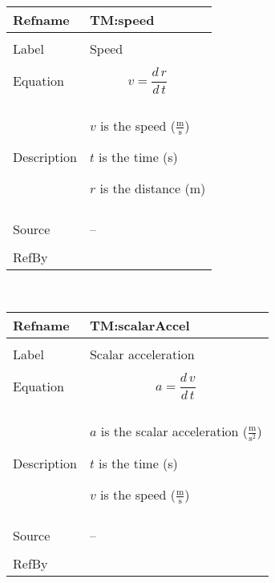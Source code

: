\documentclass[12pt]{article}
\begin{document}
\noindent \begin{minipage}{\textwidth}
\begin{tabular}{p{} p{}}
\toprule \textbf{Refname} & \textbf{TM:speed}
\label{TM:speed}
\\ \midrule \\
Label & Speed
\\ \midrule \\
Equation & \begin{displaymath}
           v=\frac{d\,r}{d\,t}
           \end{displaymath}
\\ \midrule \\
Description & \begin{symbDescription}
              \item{$v$ is the speed ($\frac{\text{m}}{\text{s}}$)}
              \item{$t$ is the time (s)}
              \item{$r$ is the distance (m)}
              \end{symbDescription}
\\ \midrule \\
Source & --
\\ \midrule \\
RefBy & 
\\ \bottomrule \end{tabular}
\end{minipage}
\par~

\noindent \begin{minipage}{\textwidth}
\begin{tabular}{p{} p{}}
\toprule \textbf{Refname} & \textbf{TM:scalarAccel}
\label{TM:scalarAccel}
\\ \midrule \\
Label & Scalar acceleration
\\ \midrule \\
Equation & \begin{displaymath}
           a=\frac{d\,v}{d\,t}
           \end{displaymath}
\\ \midrule \\
Description & \begin{symbDescription}
              \item{$a$ is the scalar acceleration ($\frac{\text{m}}{\text{s}^{2}}$)}
              \item{$t$ is the time (s)}
              \item{$v$ is the speed ($\frac{\text{m}}{\text{s}}$)}
              \end{symbDescription}
\\ \midrule \\
Source & --
\\ \midrule \\
RefBy & 
\\ \bottomrule \end{tabular}
\end{minipage}
\end{document}
